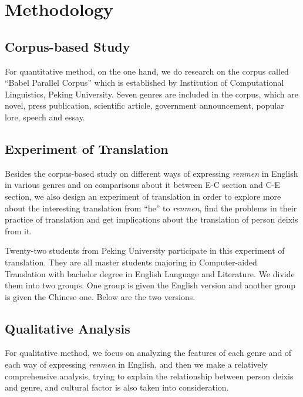 \documentclass[degree=bachelor,language=english]{thuthesis}
\begin{document}
\chapter{Methodology}

\section{Corpus-based Study}

For quantitative method, on the one hand, we do research on the corpus called “Babel Parallel Corpus” which is established by Institution of Computational Linguistics, Peking University. Seven genres are included in the corpus, which are novel, press publication, scientific article, government announcement, popular lore, speech and essay.



\section{Experiment of Translation}

Besides the corpus-based study on different ways of expressing \emph{renmen} in English in various genres and on comparisons about it between E-C section and C-E section, we also design an experiment of translation in order to explore more about the interesting translation from “he” to \emph{renmen}, find the problems in their practice of translation and get implications about the translation of person deixis from it.

Twenty-two students from Peking University participate in this experiment of translation. They are all master students majoring in Computer-aided Translation with bachelor degree in English Language and Literature. We divide them into two groups. One group is given the English version and another group is given the Chinese one. Below are the two versions.



\section{Qualitative Analysis}

For qualitative method, we focus on analyzing the features of each genre and of each way of expressing \emph{renmen} in English, and then we make a relatively comprehensive analysis, trying to explain the relationship between person deixis and genre, and cultural factor is also taken into consideration.
\end{document}
